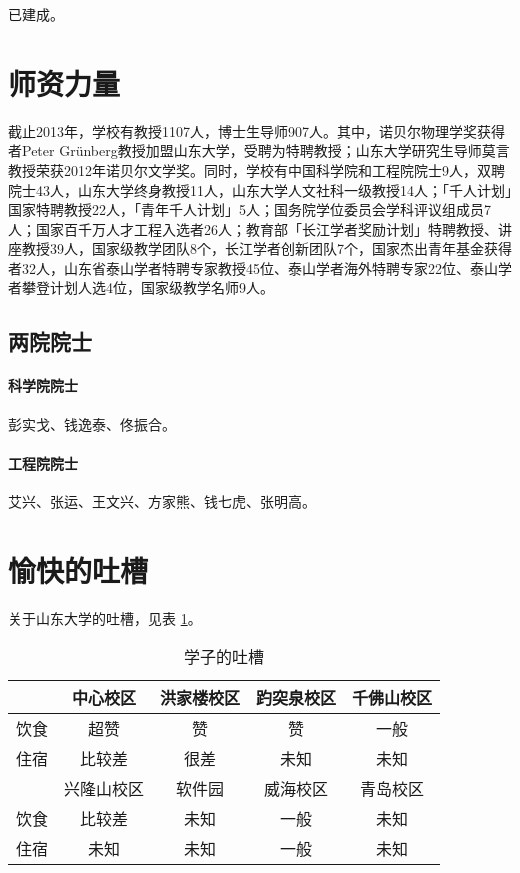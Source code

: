 \documentclass[openany]{sduthesis} %
\begin{document}
已建成。

\section{师资力量}

截止2013年，学校有教授1107人，博士生导师907人。其中，诺贝尔物理学奖获得者Peter Grünberg教授加盟山东大学，受聘为特聘教授；山东大学研究生导师莫言教授荣获2012年诺贝尔文学奖。同时，学校有中国科学院和工程院院士9人，双聘院士43人，山东大学终身教授11人，山东大学人文社科一级教授14人；「千人计划」国家特聘教授22人，「青年千人计划」5人；国务院学位委员会学科评议组成员7人；国家百千万人才工程入选者26人；教育部「长江学者奖励计划」特聘教授、讲座教授39人，国家级教学团队8个，长江学者创新团队7个，国家杰出青年基金获得者32人，山东省泰山学者特聘专家教授45位、泰山学者海外特聘专家22位、泰山学者攀登计划人选4位，国家级教学名师9人。

\subsection{两院院士}

\paragraph{科学院院士}彭实戈、钱逸泰、佟振合。

\paragraph{工程院院士}艾兴、张运、王文兴、方家熊、钱七虎、张明高。

\section{愉快的吐槽}

关于山东大学的吐槽，见表 \ref{tab:debunk}。

\begin{table}[!htb]
\centering
\caption{学子的吐槽}\label{tab:debunk}
\begin{tabular}{*5{c}}
  \toprule
  & 中心校区 & 洪家楼校区 & 趵突泉校区 & 千佛山校区 \\
  \midrule
  饮食 & 超赞 & 赞 & 赞 & 一般 \\
  住宿 & 比较差 & 很差 & 未知 & 未知\\
  \midrule[0.8pt]
  & 兴隆山校区 & 软件园 & 威海校区 & 青岛校区 \\
  \midrule
  饮食 & 比较差 & 未知 & 一般 & 未知 \\
  住宿 & 未知 & 未知 & 一般 & 未知\\
  \bottomrule
\end{tabular}
\end{table}
\clearpage
\end{document}
